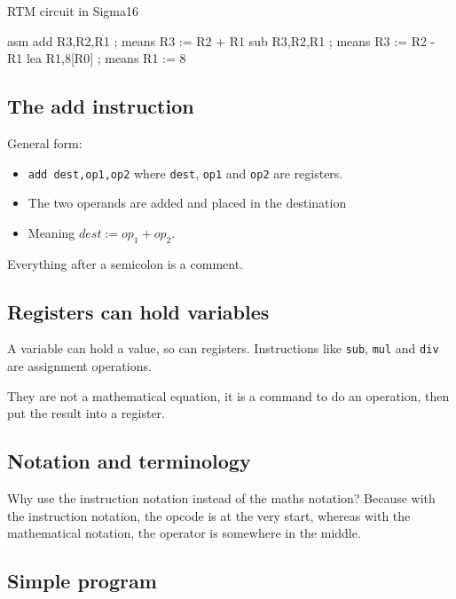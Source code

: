 \begin{highlight}{RTM circuit in Sigma16}
    \begin{code}{asm}
        add R3,R2,R1 ; means R3 := R2 + R1
        sub R3,R2,R1 ; means R3 := R2 - R1
        lea R1,8[R0] ; means R1 := 8
    \end{code}
\end{highlight}

\subsection{The add instruction}\label{sub:the_add_instruction}

General form:
\begin{itemize}
    \item \texttt{add dest,op1,op2} where \texttt{dest}, \texttt{op1} and \texttt{op2} are registers.
    \item The two operands are added and placed in the destination
    \item Meaning \(dest:=op_1+op_2\).
\end{itemize}

Everything after a semicolon is a comment.

\subsection{Registers can hold variables}\label{sub:registers_can_hold_variables}

A variable can hold a value, so can registers.
Instructions like \texttt{sub}, \texttt{mul} and \texttt{div} are assignment operations.

\begin{note}
    They are not a mathematical equation, it is a command to do an operation, then put the result into a register.
\end{note}

\subsection{Notation and terminology}\label{sub:notation_and_terminology}

Why use the instruction notation instead of the maths notation? Because with the instruction notation, the opcode is at the very start, whereas with the mathematical notation, the operator is somewhere in the middle.

\subsection{Simple program}\label{sub:simple_program}

